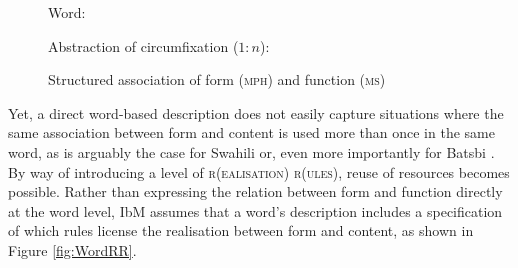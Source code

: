 \documentclass[output=paper]{langsci/langscibook}
\begin{document}
\begin{figure}
    \begin{minipage}[t]{.55\textwidth}\centering\small
      Word:\medskip\\
      \end{minipage}\begin{minipage}[t]{.45\textwidth}\centering\small
      Abstraction of circumfixation ($1:n$):\medskip\\
      \end{minipage}
  \caption{Structured association of form (\textsc{mph}) and function (\textsc{ms}) }
  \label{fig:WordMph}
\end{figure}

Yet, a direct word-based description does not easily capture situations
where the same association between form and content is used more
than once in the same word, as is arguably the case for Swahili
\citep{Stump93,Crysmann:Bonami:2016,Crysmann:Bonami:2017:HPSG} or,
even more importantly for Batsbi \citep{Harris09}. By way of
introducing a level of \textsc{r(ealisation) r(ules)}, reuse of
resources becomes possible. Rather than expressing the relation
between form and function directly at the word level, IbM assumes
that a word's description includes a specification of which rules
license the realisation between form and content, as shown in Figure
\ref{fig:WordRR}.
\end{document}
